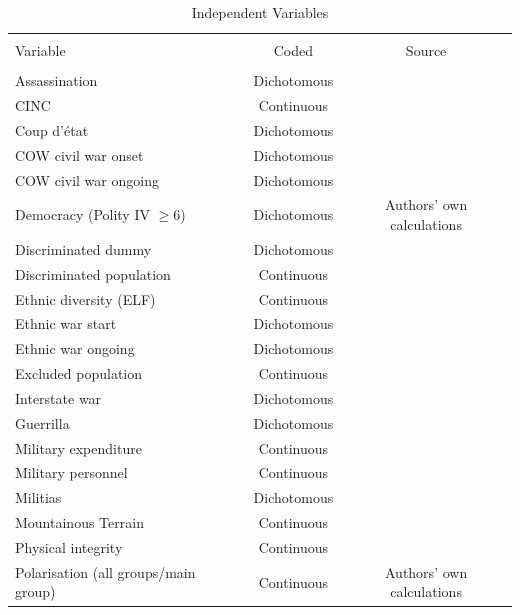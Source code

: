 \begin{table}[!htbp] \centering 
  \caption{Independent Variables} 
  \label{tab:mk-vs} 
\footnotesize
\begin{tabular}{@{\extracolsep{5pt}}lcc} 
\\[-1.8ex]\hline 
\hline \\[-1.8ex] {Variable} & \multicolumn{1}{c}{Coded} & \multicolumn{1}{c}{Source}\\ 
\hline \\[-1.8ex] 
Assassination & Dichotomous & \citet{banks1999cross} \\ 
CINC & Continuous & \citet{cow2017cinc}\\ 
Coup d'état & Dichotomous & \citet{marshall2017pitf}  \\ 
COW civil war onset & Dichotomous & \citet{cow2017cinc,singer1988reconstructing} \\ 
COW civil war ongoing & Dichotomous & \citet{cow2017cinc,singer1988reconstructing} \\ 
Democracy (Polity IV $\geq 6$) & Dichotomous  & Authors' own calculations \\ 
Discriminated dummy & Dichotomous & \citet{cederman2010ethnic}\\ 
Discriminated population & Continuous & \citet{cederman2010ethnic} \\ 
Ethnic diversity (ELF) & Continuous & \citet{fearon2003ethnicity} \\ 
Ethnic war start & Dichotomous & \citet{cederman2010ethnic} \\ 
Ethnic war ongoing & Dichotomous & \citet{cederman2010ethnic} \\ 
Excluded population & Continuous & \citet{cederman2010ethnic} \\ 
Interstate war & Dichotomous & \citet{singer1988reconstructing,cow2017cinc} \\ 
Guerrilla & Dichotomous & \citet{balcells2014does}\\ 
Military expenditure & Continuous & \citet{cow2017cinc} \\ 
Military personnel & Continuous & \citet{cow2017cinc} \\ 
Militias & Dichotomous & \citet{carey2013states} \\ 
Mountainous Terrain & Continuous & \citet{fearon2003ethnicity} \\ 
Physical integrity & Continuous & \citet{cingranelli2010cingranelli}\\ 
Polarisation (all groups/main group) & Continuous &  Authors' own calculations \\ 

\end{tabular}
\end{table}

